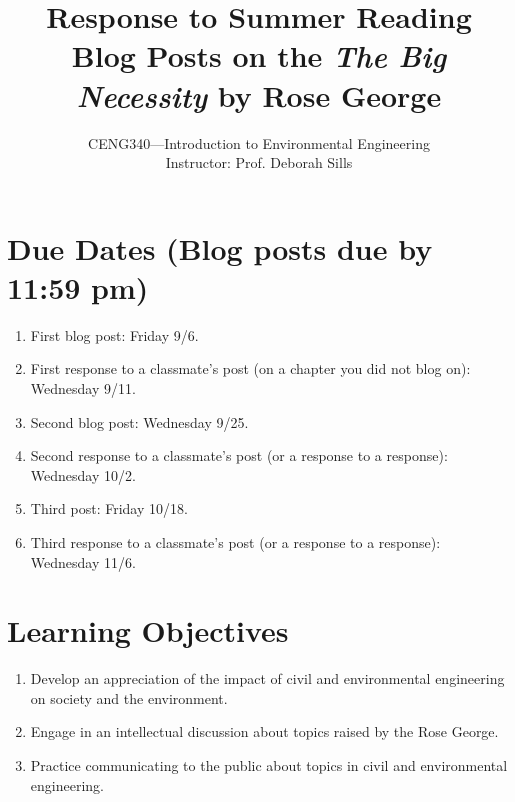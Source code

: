 \documentclass[12pt,letterpaper]{article}
\begin{document}
\setlength{\parindent}{0cm} 


\frenchspacing

\title{Response to Summer Reading \\ \vspace{2 mm} {\Large Blog Posts on the \emph{The Big Necessity} by Rose George}}

\author {CENG340---Introduction to Environmental Engineering\\ \vspace{2 mm} {Instructor: Prof. Deborah Sills}}
\date {}
\maketitle

\section *{Due Dates (Blog posts due by 11:59 pm)}
\begin{enumerate}
\item First blog post: Friday 9/6.
\item First response to a classmate's post (on a chapter you did not blog on): Wednesday 9/11.
\item Second blog post: Wednesday 9/25.
\item Second response to a classmate's post (or a response to a response): Wednesday 10/2.
\item Third post: Friday 10/18.
\item Third response to  a classmate's post (or a response to a response): Wednesday 11/6.
\end{enumerate}

\section *{Learning Objectives}
\begin{enumerate}
\item Develop an appreciation of the impact of civil and environmental engineering on society and the environment.
\item Engage in an intellectual discussion about topics raised by the Rose George.
\item Practice communicating to the public about topics in civil and environmental engineering.
\end{enumerate}
\end{document}
